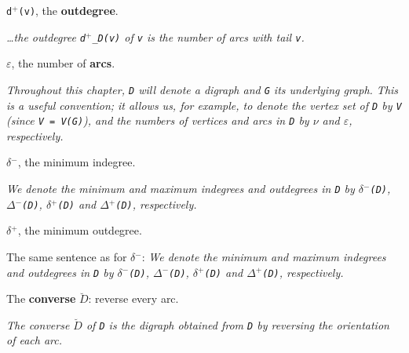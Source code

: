 \begin{definition}
\label{Digraph.outdegree}
\leanok
\texttt{d$^{+}$(v)}, the \textbf{outdegree}.

\emph{\dots{}the outdegree \texttt{d$^{+}$\_D(v)} of \texttt{v} is the
number of arcs with tail \texttt{v}.}
\end{definition}

\begin{definition}
\label{Digraph.arcCount}
\leanok
\texttt{$\varepsilon$}, the number of \textbf{arcs}.

\emph{Throughout this chapter, \texttt{D} will
denote a digraph and \texttt{G} its underlying graph.  This is a useful convention; it
allows us, for example, to denote the vertex set of \texttt{D} by \texttt{V} (since
\texttt{V = V(G)}), and the numbers of vertices and arcs in \texttt{D} by \texttt{$\nu$} and \texttt{$\varepsilon$},
respectively.}
\end{definition}

\begin{definition}
\label{Digraph.minIndegree}
\leanok
{}
\texttt{$\delta$$^{-}$}, the minimum indegree.

\emph{We denote the minimum and maximum
indegrees and outdegrees in \texttt{D} by \texttt{$\delta$$^{-}$(D)},
\texttt{$\Delta$$^{-}$(D)}, \texttt{$\delta$$^{+}$(D)} and \texttt{$\Delta$$^{+}$(D)},
respectively.}
\end{definition}

\begin{definition}
\label{Digraph.minOutdegree}
\leanok
{}
\texttt{$\delta$$^{+}$}, the minimum outdegree.

The same sentence as for \texttt{$\delta$$^{-}$}: \emph{We denote the
minimum and maximum indegrees and outdegrees in \texttt{D} by
\texttt{$\delta$$^{-}$(D)}, \texttt{$\Delta$$^{-}$(D)}, \texttt{$\delta$$^{+}$(D)}
and \texttt{$\Delta$$^{+}$(D)}, respectively.}
\end{definition}

\begin{definition}
\label{Digraph.converse}
\leanok
The \textbf{converse} \texttt{$\breve{D}$}: reverse every arc.

\emph{The converse \texttt{$\breve{D}$} of \texttt{D} is
the digraph obtained from \texttt{D} by reversing the orientation of each arc.}
\end{definition}

